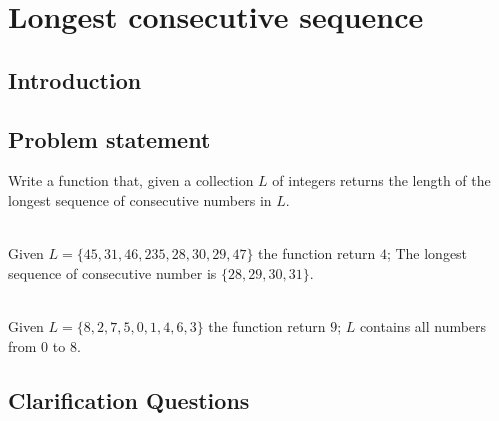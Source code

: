 %



\chapter{Longest consecutive sequence}
\label{ch:longest_consecutive_sequence}
\section*{Introduction}

\section{Problem statement}
\begin{exercise}
Write a function that, given a collection $L$ of integers returns the length of the longest sequence of consecutive numbers in $L$.
\label{example:longest_consecutive_sequence:exercice1}

	\begin{example}
		\label{example:longest_consecutive_sequence:example1}
		\hfill \\
		Given $L=\{45,31,46,235,28,30,29,47\}$ the function return $4$; The longest sequence of consecutive number is $\{28,29,30,31\}$.		
	\end{example}

	\begin{example}
		\label{example:longest_consecutive_sequence:example2}
		\hfill \\
		Given $L=\{8,2,7,5,0,1,4,6,3\}$ the function return $9$; $L$ contains all numbers from $0$ to $8$.				
	\end{example}

\end{exercise}

\section{Clarification Questions}

